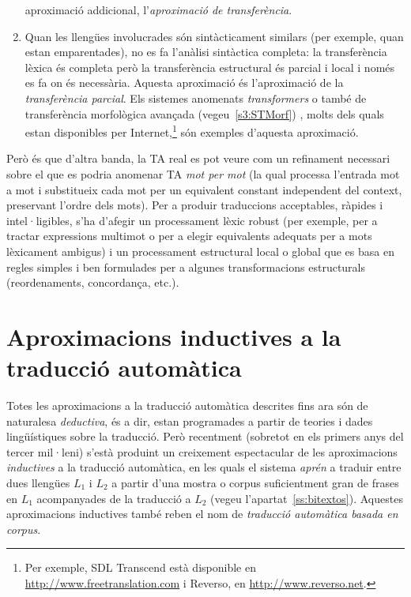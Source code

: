 \begin{enumerate}
  aproximació addicional, l'\emph{aproximació de transferència}.
\item Quan les llengües involucrades són sintàcticament similars (per
  exemple, quan estan emparentades), no es fa l'anàlisi sintàctica
  completa: la transferència lèxica és completa però la transferència
  estructural és parcial i local i només es fa on és necessària.
  Aquesta aproximació és l'aproximació de la \emph{transferència
    parcial}. Els sistemes anomenats \emph{transformers} o també de
  transferència morfològica avançada (vegeu~\ref{s3:STMorf})
  \citep[4.2]{arnold94b}, molts dels quals estan disponibles per
  Internet,\footnote{Per exemple, SDL Transcend està disponible en
    \url{http://www.freetranslation.com} i Reverso, en
    \url{http://www.reverso.net}.} són exemples d'aquesta
  aproximació.
\end{enumerate}

Però és que d'altra banda, la TA real es pot veure com un refinament
necessari sobre el que es podria anomenar TA \emph{mot per mot} (la
qual processa l'entrada mot a mot i substitueix cada mot per un
equivalent constant independent del context, preservant l'ordre dels
mots). Per a produir traduccions acceptables, ràpides i
intel·ligibles, s'ha d'afegir un processament lèxic robust (per
exemple, per a tractar expressions multimot o per a elegir equivalents
adequats per a mots lèxicament ambigus) i un processament estructural
local o global que es basa en regles simples i ben formulades per a
algunes transformacions estructurals (reordenaments, concordança,
etc.).


\section[Aproximacions inductives a la TA]{Aproximacions inductives a la traducció automàtica}
\label{ss:induc}

Totes les aproximacions a la traducció automàtica descrites fins ara
són de naturalesa \emph{deductiva}, és a dir, estan programades a
partir de teories i dades lingüístiques sobre la traducció. Però
recentment (sobretot en els primers anys del tercer mil·leni) s'està
produint un creixement espectacular de les aproximacions
\emph{inductives} a la traducció automàtica, en les quals el sistema
\emph{aprén} a traduir entre dues llengües $L_1$ i $L_2$ a partir
d'una mostra o corpus suficientment gran de frases en $L_1$
acompanyades de la traducció a $L_2$ (vegeu
l'apartat~\ref{ss:bitextos}). Aquestes aproximacions inductives també
reben el nom de \emph{traducció automàtica basada en corpus}.

